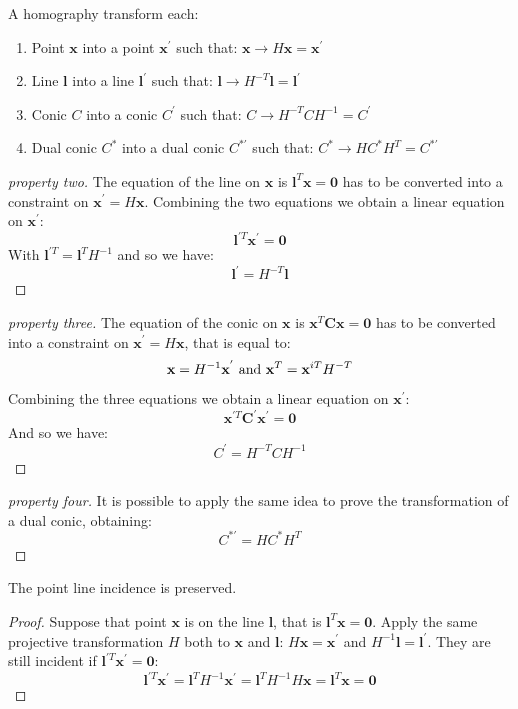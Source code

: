 \documentclass[12pt, a4paper]{report}
\newtheorem[style=M,bodystyle=\normalfont]{theorem}{Theorem}
\newtheorem[style=M,bodystyle=\normalfont]{corollary}{Corollary}
\newtheorem[style=M,bodystyle=\normalfont]{lemma}{Lemma}
\newtheorem[style=M,bodystyle=\normalfont]{definition}{Definition}
\begin{document}
    \begin{definition}
        A homography transform each: 
        \begin{enumerate}
            \item Point $\textbf{x}$ into a point $\textbf{x}^{'}$ such that: $\textbf{x} \rightarrow H \textbf{x}=\textbf{x}^{'}$
            \item Line $\textbf{l}$ into a line $\textbf{l}^{'}$ such that: $\textbf{l} \rightarrow H^{-T} \textbf{l}=\textbf{l}^{'}$
            \item Conic $C$ into a conic $C^{'}$ such that: $C \rightarrow H^{-T} CH^{-1}=C^{'}$
            \item Dual conic $C^{*}$ into a dual conic $C^{*'}$ such that: $C^{*} \rightarrow H C^{*}H^{T}=C^{*'}$
        \end{enumerate}
    \end{definition}
    \begin{proof}[property two]
        The equation of the line on $\textbf{x}$ is $\textbf{l}^T\textbf{x}=\textbf{0}$ has to be converted into a constraint on $\textbf{x}^{'} = H \textbf{x}$. Combining the two 
        equations we obtain a linear equation on $\textbf{x}^{'}$: 
        \[\textbf{l}^{'T}\textbf{x}^{'}=\textbf{0}\]
        With $\textbf{l}^{'T}=\textbf{l}^{T}H^{-1}$ and so we have: 
        \[\textbf{l}^{'}=H^{-T}\textbf{l}\]
    \end{proof}
    \begin{proof}[property three]
        The equation of the conic on $\textbf{x}$ is $\textbf{x}^{T}\textbf{C}\textbf{x}=\textbf{0}$ has to be converted into a constraint on $\textbf{x}^{'} = H \textbf{x}$, that 
        is equal to:
        \[\textbf{x}=H^{-1}\textbf{x}^{'} \textnormal{ and } \textbf{x}^{T}=\textbf{x}^{iT}H^{-T}\]
        Combining the three equations we obtain a linear equation on $\textbf{x}^{'}$: 
        \[\textbf{x}^{'T}\textbf{C}^{'}\textbf{x}^{'}=\textbf{0}\]
        And so we have: 
        \[C^{'}=H^{-T} CH^{-1}\]
    \end{proof}
    \begin{proof}[property four]
        It is possible to apply the same idea to prove the transformation of a dual conic, obtaining:
        \[C^{*'}=H C^{*}H^{T}\]
    \end{proof}
    The point line incidence is preserved. 
    \begin{proof}
        Suppose that point $\textbf{x}$ is on the line $\textbf{l}$, that is $\textbf{l}^T\textbf{x}=\textbf{0}$. Apply the same projective transformation $H$ both to $\textbf{x}$ 
        and $\textbf{l}$: $H\textbf{x}=\textbf{x}^{'}$ and $H^{-1}\textbf{l}=\textbf{l}^{'}$. They are still incident if $\textbf{l}^{'T}\textbf{x}^{'}=\textbf{0}$:
        \[\textbf{l}^{'T}\textbf{x}^{'}=\textbf{l}^{T}H^{-1}\textbf{x}^{'}=\textbf{l}^{T}H^{-1}H\textbf{x}=\textbf{l}^{T}\textbf{x}=\textbf{0}\]
    \end{proof}
\end{document}
